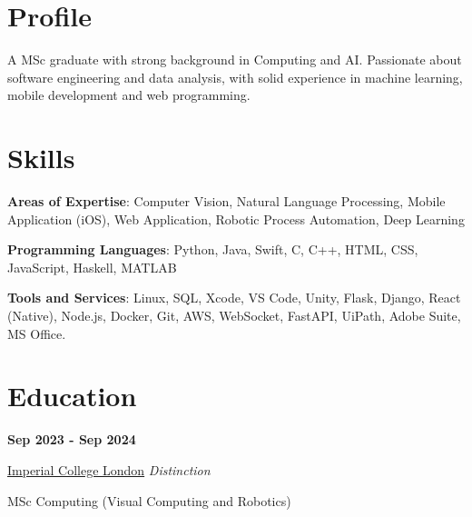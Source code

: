 \documentclass[9pt,a4paper]{article} %
\begin{document}
\begin{multicols}{2}


\section{Profile}
A MSc graduate with strong background in Computing and AI. Passionate about software engineering and data analysis, with solid experience in machine learning, mobile development and web programming.


\section{Skills}

\textbf{Areas of Expertise}: Computer Vision, Natural Language Processing, Mobile Application (iOS), Web Application, Robotic Process Automation, Deep Learning
\vspace{2mm}

\textbf{Programming Languages}: Python, Java, Swift, C, C++, HTML, CSS, JavaScript, Haskell, MATLAB
\vspace{2mm}

\textbf{Tools and Services}: Linux, SQL, Xcode, VS Code, Unity, Flask, Django, React (Native), Node.js, Docker, Git, AWS, WebSocket, FastAPI, UiPath, Adobe Suite, MS Office.


\section{Education}

\textbf{Sep 2023 - Sep 2024}

\href{https://www.imperial.ac.uk}{Imperial College London} \hfill \textit{Distinction}

MSc Computing (Visual Computing and Robotics)
\vspace{2mm}


\end{multicols}
\end{document}
